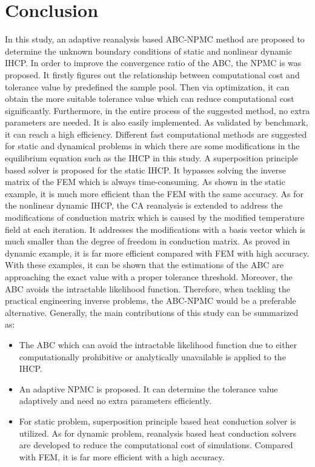 \documentclass[review]{elsarticle}
\begin{document}
\section{Conclusion}
In this study, an adaptive reanalysis based ABC-NPMC method are proposed to determine the unknown boundary conditions of static and nonlinear dynamic IHCP. In order to improve the convergence ratio of the ABC, the NPMC is was proposed. It firstly figures out the relationship between computational cost and tolerance value by predefined the sample pool. Then via optimization, it can obtain the more suitable tolerance value which can reduce computational cost significantly. Furthermore, in the entire process of the suggested method, no extra parameters are needed. It is also easily implemented. As validated by benchmark, it can reach a high efficiency.
Different fast computational methods are suggested for static and dynamical problems in which there are some modifications in the equilibrium equation such as the IHCP in this study. A superposition principle based solver is proposed for the static IHCP. It bypasses solving the inverse matrix of the FEM which is always time-consuming. As shown in the static example, it is much more efficient than the FEM with the same accuracy. As for the nonlinear dynamic IHCP, the CA reanalysis is extended to address the modifications of conduction matrix which is caused by the modified temperature field at each iteration. It addresses the modifications with a basis vector which is much smaller than the degree of freedom in conduction matrix. As proved in dynamic example, it is far more efficient compared with FEM with high accuracy.
With these examples, it can be shown that the estimations of the ABC are approaching the exact value with a proper tolerance threshold. Moreover, the ABC avoids the intractable likelihood function. Therefore, when tackling the practical engineering inverse problems, the ABC-NPMC would be a preferable alternative.
Generally, the main contributions of this study can be summarized as:
\begin{itemize}
    \item The ABC which can avoid the intractable likelihood function due to either computationally prohibitive or analytically unavailable is applied to the IHCP. 
    \item An adaptive NPMC is proposed. It can determine the tolerance value adaptively and need no extra parameters efficiently. 
    \item For static problem, superposition principle based heat conduction solver is utilized. As for dynamic problem, reanalysis based heat conduction solvers are developed to reduce the computational cost of simulations. Compared with FEM, it is far more efficient with a high accuracy.
\end{itemize}
\end{document}
